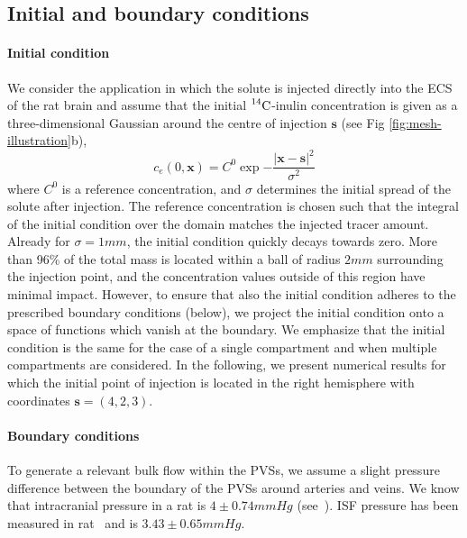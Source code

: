 \documentclass[a4paper,11pt]{article}
\newcommand{\1}{^{(1)}}
\newcommand{\2}{^{(2)}}
\newcommand {\x}   {\mathbf{x}}
\newcommand{\Cinulin}{$\prescript{14}{}{\text{C}}$-inulin }
\begin{document}
\subsection{Initial and boundary conditions} \label{subsec:Init-bound}
\paragraph{Initial condition}

We consider the application in which the solute is injected directly into the ECS of the rat brain and assume that the initial \Cinulin concentration is given as a three-dimensional Gaussian around the centre of injection $ \mathbf{s} $ (see Fig \ref{fig:mesh-illustration}b),
\begin{equation}
    c_e(0, \x) = C^0 \exp{-\frac{|\x - \mathbf{s}|^2}{\sigma^2}} 
    \label{eq:inulin-initial}
\end{equation}
where $C^0$ is a reference concentration, and $ \sigma $ determines the initial spread of the solute after injection. The reference concentration is chosen such that the integral of the initial condition over the domain matches the injected tracer amount. Already for $\sigma = 1\si{mm}$, the initial condition quickly decays towards zero. More than 96\% of the total mass is located within a ball of radius $2\si{mm}$ surrounding the injection point, and the concentration values outside of this region have minimal impact. However, to ensure that also the initial condition adheres to the prescribed boundary conditions (below), we project the initial condition onto a space of functions which vanish at the boundary. We emphasize that the initial condition is the same for the case of a single compartment and when multiple compartments are considered. 
In the following, we present numerical results for which the initial point of injection is located in the right hemisphere with coordinates $\mathbf{s} = (4,2,3)$. 


\paragraph{Boundary conditions}
To generate a relevant bulk flow within the PVSs, we assume a slight pressure difference between the boundary of the PVSs around arteries and veins.
We know that intracranial pressure in a rat is $4 \pm 0.74 \si{mmHg}$ (see~\cite{Roy-rat-pressure-2013}). 
ISF pressure has been measured in rat~\cite{Wiig-1983-interstitial} and is $3.43 \pm 0.65  \si{mmHg}$.
\end{document}
